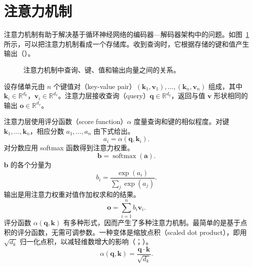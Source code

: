 \section{注意力机制}
注意力机制有助于解决基于循环神经网络的编码器—解码器架构中的问题。如图~\ref{fig:ch02-attention} 所示，可以把注意力机制看成一个存储库。收到查询时，它根据存储的键和值产生输出（）。

\begin{figure}[!htbp]
\centering

\caption{注意力机制中查询、键、值和输出向量之间的关系。}
\label{fig:ch02-attention}
\end{figure}

设存储单元由 $n$ 个键值对（key-value pair）$(\symbf{k}_1,\symbf{v}_1),\ldots,(\symbf{k}_n,\symbf{v}_n)$ 组成，其中 $\symbf{k}_i\in\mathbb{R}^{d_k}$，$\symbf{v}_i\in\mathbb{R}^{d_v}$。注意力层接收查询（query）$\symbf{q}\in\mathbb{R}^{d_q}$，返回与值 $\symbf{v}$ 形状相同的输出 $\symbf{o}\in\mathbb{R}^{d_v}$。

注意力层使用评分函数（score function）$\alpha$ 度量查询和键的相似程度。对键 $\symbf{k}_1,\ldots,\symbf{k}_n$，相应分数 $a_1,\ldots,a_n$ 由下式给出。
\begin{equation}
a_i=\alpha(\symbf{q},\symbf{k}_i).
\tag{2.7}
\end{equation}
对分数应用 softmax 函数得到注意力权重。
\begin{equation}
\symbf{b}=\operatorname{softmax}(\symbf{a}).
\tag{2.8}
\end{equation}
$\symbf{b}$ 的各个分量为
\begin{equation}
b_i=\frac{\exp(a_i)}{\sum_j\exp(a_j)}.
\tag{2.9}
\end{equation}
输出是用注意力权重对值作加权求和的结果。
\begin{equation}
\symbf{o}=\sum_{i=1}^{n} b_i\symbf{v}_i.
\tag{2.10}
\end{equation}
评分函数 $\alpha(\symbf{q},\symbf{k})$ 有多种形式，因而产生了多种注意力机制。最简单的是基于点积的评分函数，无需可调参数。一种变体是缩放点积（scaled dot product），即用 $\sqrt{d_k}$ 归一化点积，以减轻维数增大的影响（；）。
\begin{equation}
\alpha(\symbf{q},\symbf{k})=\frac{\symbf{q}\cdot\symbf{k}}{\sqrt{d_k}}.
\tag{2.11}
\end{equation}

